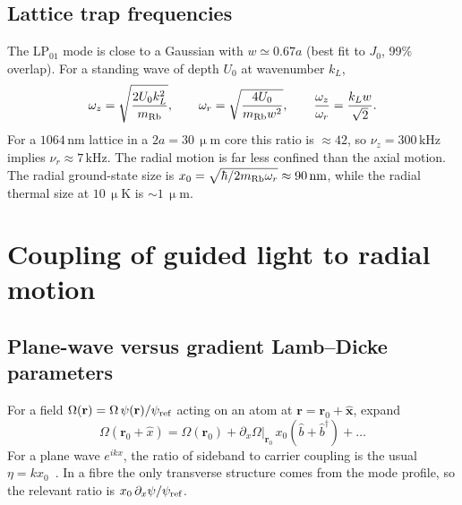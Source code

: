 \documentclass[11pt,a4paper]{article}
\newcommand{\micrometre}{\upmu m}\newcommand{\microkelvin}{\upmu K}
\newcommand{\SI}[2]{\ensuremath{#1\,\mathrm{#2}}}
\newcommand{\Om}{\Omega}
\begin{document}
\subsection{Lattice trap frequencies}
The LP$_{01}$ mode is close to a Gaussian with $w\simeq0.67a$ (best fit to $J_0$, 99\% overlap). For a standing wave of depth $U_0$ at wavenumber $k_L$,
\begin{equation}
  \omega_z=\sqrt{\frac{2U_0k_L^2}{m_{\rm Rb}}},\qquad
  \omega_r=\sqrt{\frac{4U_0}{m_{\rm Rb}w^2}},\qquad
  \frac{\omega_z}{\omega_r}=\frac{k_Lw}{\sqrt2}.
  \label{eq:freqs}
\end{equation}
For a \SI{1064}{nm} lattice in a $2a=\SI{30}{\micrometre}$ core this ratio is $\approx42$, so $\nu_z=\SI{300}{kHz}$ implies $\nu_r\approx\SI{7}{kHz}$. The radial motion is far less confined than the axial motion. The radial ground-state size is $x_0=\sqrt{\hbar/2m_{\rm Rb}\omega_r}\approx\SI{90}{nm}$, while the radial thermal size at \SI{10}{\microkelvin} is $\sim\SI{1}{\micrometre}$.

\section{Coupling of guided light to radial motion}
\label{sec:coupling}
\subsection{Plane-wave versus gradient Lamb--Dicke parameters}
For a field $\Om(\mathbf r)=\Om\,\psi(\mathbf r)/\psi_{\rm ref}$ acting on an atom at $\mathbf r=\mathbf r_0+\hat{\mathbf x}$, expand
\begin{equation}
  \Om(\mathbf r_0+\hat x)=\Om(\mathbf r_0)+\partial_x\Om\big|_{\mathbf r_0}\,x_0(\hat b+\hat b^\dagger)+\dots
\end{equation}
For a plane wave $e^{ikx}$, the ratio of sideband to carrier coupling is the usual $\eta=kx_0$~\cite{wineland1979,leibfried2003}. In a fibre the only transverse structure comes from the mode profile, so the relevant ratio is $x_0\,\partial_x\psi/\psi_{\rm ref}$.
\end{document}
